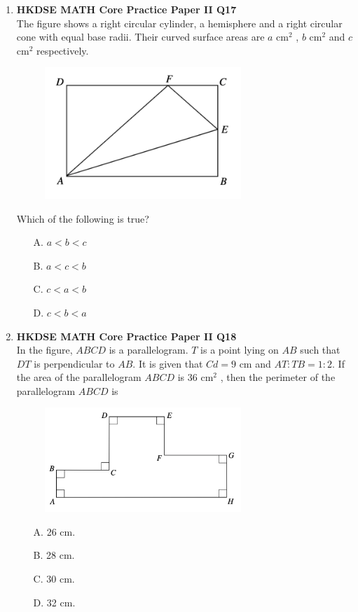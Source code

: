 \documentclass[12pt]{article}
\begin{document}
\begin{enumerate}
	\item \textbf{HKDSE MATH Core Practice Paper II Q17}\\
	The figure shows a right circular cylinder, a hemisphere and a right circular cone with equal base radii. Their curved surface areas are $a$ cm$^2$ , $b$ cm$^2$ and $c$ cm$^2$ respectively.\\
	\begin{figure}[H]
		\centering
		\includegraphics[width = 0.7\textwidth]{PPFigure2.17.png}	
	\end{figure}
	Which of the following is true?
	\begin{enumerate}
		\item[A.] $a < b < c$
		\item[B.] $a < c < b$
		\item[C.] $c < a < b$
		\item[D.] $c < b < a$
	\end{enumerate}

	\item \textbf{HKDSE MATH Core Practice Paper II Q18}\\
	In the figure, $ABCD$ is a parallelogram. $T$ is a point lying on $AB$ such that $DT$ is perpendicular to $AB$. It is given that $Cd = 9$ cm and $AT : TB = 1 : 2$. If the area of the parallelogram $ABCD$ is 36 cm$^2$ , then the perimeter of the parallelogram $ABCD$ is
	\begin{figure}[H]
		\centering
		\includegraphics[width = 0.7\textwidth]{PPFigure2.18.png}	
	\end{figure}
	\begin{enumerate}
		\item[A.] 26 cm.
		\item[B.] 28 cm.
		\item[C.] 30 cm.
		\item[D.] 32 cm.
	\end{enumerate}


\end{enumerate}
\end{document}
